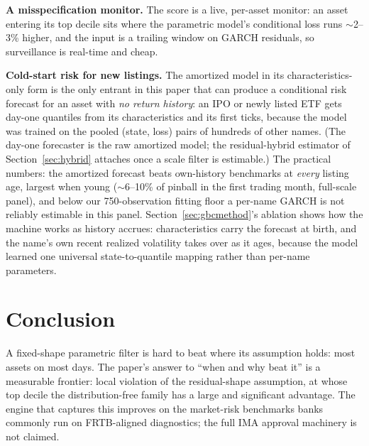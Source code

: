 \documentclass[11pt]{article}
\theoremstyle{remark}
\begin{document}
\textbf{A misspecification monitor.} The score is a live, per-asset
monitor: an asset entering its top decile sits where the parametric
model's conditional loss runs $\sim$2--3\% higher, and the input is a
trailing window on GARCH residuals, so surveillance is real-time and
cheap.

\textbf{Cold-start risk for new listings.} The amortized model in its
characteristics-only form is the
only entrant in this paper that can produce a conditional risk forecast
for an asset with \emph{no return history}: an IPO or newly listed
ETF gets day-one quantiles from its characteristics and
its first ticks, because the model was trained on the pooled
(state, loss) pairs of hundreds of other names. (The day-one forecaster is the raw amortized model; the
residual-hybrid estimator of Section~\ref{sec:hybrid} attaches once a
scale filter is estimable.) The practical numbers:
the amortized forecast beats own-history benchmarks at \emph{every}
listing age, largest when young ($\sim$6--10\% of pinball in the
first trading month, full-scale panel), and below our
750-observation fitting floor a per-name GARCH is not reliably
estimable in this panel. Section~\ref{sec:gbcmethod}'s ablation shows
how the machine works as history accrues: characteristics carry the forecast at birth, and
the name's own recent realized volatility takes over as it ages,
because the model learned one universal state-to-quantile mapping
rather than per-name parameters.


\section{Conclusion}\label{sec:limitations}

A fixed-shape parametric filter is hard to beat where its
assumption holds: most assets on most days. The paper's answer to
``when and why beat it'' is a measurable frontier: local violation of
the residual-shape assumption, at whose top decile the
distribution-free family has a large and significant advantage. The
engine that captures this improves on the market-risk benchmarks banks
commonly run on FRTB-aligned diagnostics; the full IMA approval
machinery is not claimed.
\end{document}
